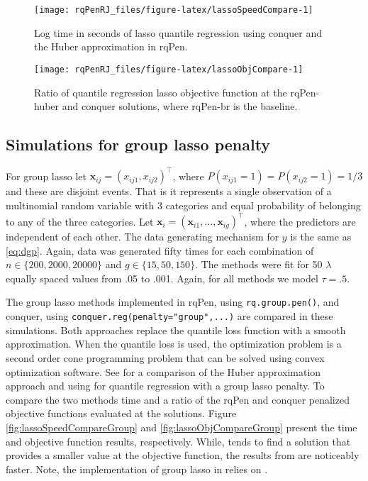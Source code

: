 \begin{figure}

{\centering \texttt{[image: rqPenRJ\_files/figure-latex/lassoSpeedCompare-1]} 

}

\caption{Log time in seconds of lasso quantile regression using conquer and the Huber approximation in rqPen.}\label{fig:lassoSpeedCompare}
\end{figure}

\begin{figure}

{\centering \texttt{[image: rqPenRJ\_files/figure-latex/lassoObjCompare-1]} 

}

\caption{Ratio of quantile regression lasso objective function at the rqPen-huber and conquer solutions, where rqPen-br is the baseline.}\label{fig:lassoObjCompare}
\end{figure}

\subsection{Simulations for group lasso penalty}\label{simulations-for-group-lasso-penalty}

For group lasso let \(\mathbf{x}_{ij}=(x_{ij1},x_{ij2})^\top\), where \(P(x_{ij1}=1)=P(x_{ij2}=1)=1/3\) and these are disjoint events. That is it represents a single observation of a multinomial random variable with 3 categories and equal probability of belonging to any of the three categories. Let \(\mathbf{x}_i = (\mathbf{x}_{i1},\ldots,\mathbf{x}_{ig})^\top\), where the predictors are independent of each other. The data generating mechanism for \(y\) is the same as \eqref{eq:dgp}. Again, data was generated fifty times for each combination of \(n \in \{200,2000,20000\}\) and \(g \in \{15,50,150\}\). The methods were fit for 50 \(\lambda\) equally spaced values from .05 to .001. Again, for all methods we model \(\tau=.5\).

The group lasso methods implemented in rqPen, using \texttt{rq.group.pen()}, and conquer, using \texttt{conquer.reg(penalty="group",...)} are compared in these simulations. Both approaches replace the quantile loss function with a smooth approximation. When the quantile loss is used, the optimization problem is a second order cone programming problem that can be solved using convex optimization software. See \citet{SherwoodLi2022} for a comparison of the Huber approximation approach and using  for quantile regression with a group lasso penalty. To compare the two methods time and a ratio of the rqPen and conquer penalized objective functions evaluated at the solutions. Figure \ref{fig:lassoSpeedCompareGroup} and \ref{fig:lassoObjCompareGroup} present the time and objective function results, respectively. While,  tends to find a solution that provides a smaller value at the objective function, the results from  are noticeably faster. Note, the implementation of group lasso in  relies on .

